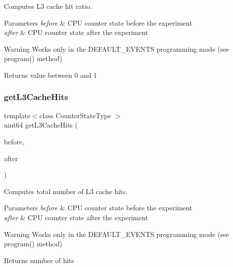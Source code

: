 Computes L3 cache hit ratio. 


\begin{DoxyParams}{Parameters}
{\em before} & C\+PU counter state before the experiment \\
\hline
{\em after} & C\+PU counter state after the experiment \\
\hline
\end{DoxyParams}
\begin{DoxyWarning}{Warning}
Works only in the D\+E\+F\+A\+U\+L\+T\+\_\+\+E\+V\+E\+N\+TS programming mode (see program() method) 
\end{DoxyWarning}
\begin{DoxyReturn}{Returns}
value between 0 and 1 
\end{DoxyReturn}
\mbox{\label{classBasicCounterState_a7ba16714ef7ed547ad8648cb5b9e52f6}} 
\subsubsection{get\+L3\+Cache\+Hits}
{\footnotesize\ttfamily template$<$class Counter\+State\+Type $>$ \\
uint64 get\+L3\+Cache\+Hits (\begin{DoxyParamCaption}\item[{const Counter\+State\+Type \&}]{before,  }\item[{const Counter\+State\+Type \&}]{after }\end{DoxyParamCaption})\hspace{0.3cm}{\ttfamily [friend]}}



Computes total number of L3 cache hits. 


\begin{DoxyParams}{Parameters}
{\em before} & C\+PU counter state before the experiment \\
\hline
{\em after} & C\+PU counter state after the experiment \\
\hline
\end{DoxyParams}
\begin{DoxyWarning}{Warning}
Works only in the D\+E\+F\+A\+U\+L\+T\+\_\+\+E\+V\+E\+N\+TS programming mode (see program() method) 
\end{DoxyWarning}
\begin{DoxyReturn}{Returns}
number of hits 
\end{DoxyReturn}
\mbox{\label{classBasicCounterState_ace0e3ffc23c20d0eda7663cb7e4899a2}} 
